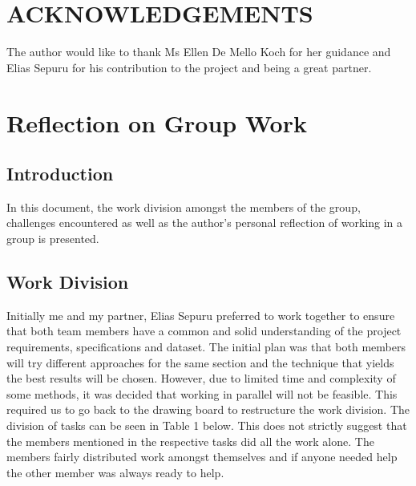 \documentclass[10pt,twocolumn]{witseiepaper}
\begin{document}

\section*{ACKNOWLEDGEMENTS}
The author would like to thank Ms Ellen De Mello Koch for her guidance and Elias Sepuru for his contribution to the project and being a great partner.



%




\newpage
\onecolumn
\appendices

\section{Reflection on Group Work}

\subsection{\textbf{Introduction}}
In this document, the work division amongst the members of the group, challenges encountered as well as the author's personal reflection of working in a group is presented.

\subsection{\textbf{Work Division}}
Initially me and my partner, Elias Sepuru preferred to work together to ensure that both team members have a common and solid understanding of the project requirements, specifications and dataset. The initial plan was that both members will try different approaches for the same section and the technique that yields the best results will be chosen. However, due to limited time and complexity of some methods, it was decided that working in parallel will not be feasible. This required us to go back to the drawing board to restructure the work division. The division of tasks can be seen in Table 1 below. This does not strictly suggest that the members mentioned in the respective tasks did all the work alone. The members fairly distributed work amongst themselves and if anyone needed help the other member was always ready to help.
\end{document}
